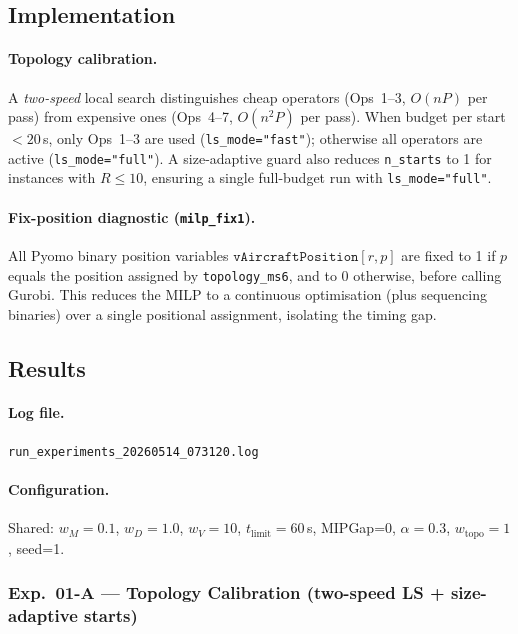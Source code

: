 \subsection{Implementation}

\paragraph{Topology calibration.}

A \emph{two-speed} local search distinguishes cheap operators (Ops~1--3,
$O(nP)$ per pass) from expensive ones (Ops~4--7, $O(n^2 P)$ per pass).
When budget per start $< 20$\,s, only Ops~1--3 are used (\texttt{ls\_mode="fast"});
otherwise all operators are active (\texttt{ls\_mode="full"}).
A size-adaptive guard also reduces \texttt{n\_starts} to 1 for instances with
$R \leq 10$, ensuring a single full-budget run with \texttt{ls\_mode="full"}.

\paragraph{Fix-position diagnostic (\texttt{milp\_fix1}).}

All Pyomo binary position variables $\mathtt{vAircraftPosition}[r,p]$ are
fixed to 1 if $p$ equals the position assigned by \texttt{topology\_ms6},
and to 0 otherwise, before calling Gurobi.  This reduces the MILP to a
continuous optimisation (plus sequencing binaries) over a single positional
assignment, isolating the timing gap.

\subsection{Results}
\label{exp:exp01-results}

\paragraph{Log file.}
\texttt{run\_experiments\_20260514\_073120.log}

\paragraph{Configuration.}
Shared: $w_M=0.1$, $w_D=1.0$, $w_V=10$, $t_{\text{limit}}=60$\,s,
MIPGap=0, $\alpha=0.3$, $w_{\text{topo}}=1$, seed=1.

\subsubsection{Exp.~01-A — Topology Calibration (two-speed LS + size-adaptive starts)}

